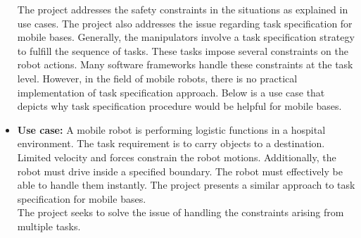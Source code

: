 \begin{itemize}
	The project addresses the safety constraints in the situations as explained in use cases. The project also addresses the issue regarding task specification for mobile bases. Generally, the manipulators involve a task specification strategy to fulfill the sequence of tasks. These tasks impose several constraints on the robot actions. Many software frameworks handle these constraints at the task level. However, in the field of mobile robots, there is no practical implementation of task specification approach. Below is a use case that depicts why task specification procedure would be helpful for mobile bases. 
	\item \textbf{Use case:} A mobile robot is performing logistic functions in a hospital environment. The task requirement is to carry objects to a destination. Limited velocity and forces constrain the robot motions. Additionally, the robot must drive inside a specified boundary. The robot must effectively be able to handle them instantly. The project presents a similar approach to task specification for mobile bases.\\ The project seeks to solve the issue of handling the constraints arising from multiple tasks.
	
\end{itemize}

%
%
%
